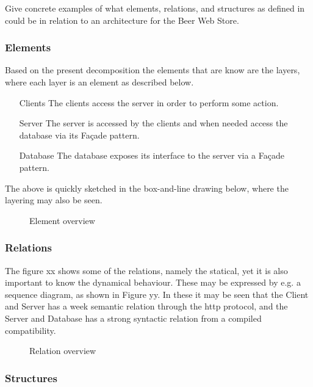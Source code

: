 \begin{question}
Give concrete examples of what elements, relations, and structures as defined in \cite{bass2003sa} could be in relation to an architecture for the Beer Web Store.
\end{question}

\subsubsection{Elements}
Based on the present decomposition the elements that are know are the layers, where each layer is an element as described below.
\begin{itemize}
    \item[Clients] The clients access the server in order to perform some action.
    \item[Server] The server is accessed by the clients and when needed access the database via its Fa\c cade pattern.
    \item[Database] The database exposes its interface to the server via a Fa\c cade pattern.
\end{itemize}
The above is quickly sketched in the box-and-line drawing below, where the layering may also be seen. 
\begin{figure}[!htb]
\centerline{}
\caption{Element overview}
\label{fig:module_view}
\end{figure}
\clearpage

\subsubsection{Relations}
The figure xx shows some of the relations, namely the statical, yet it is also important to know the dynamical behaviour. These may be expressed by e.g. a sequence diagram, as shown in Figure yy. In these it may be seen that the Client and Server has a week semantic relation through the http protocol, and the Server and Database has a strong syntactic relation from a compiled compatibility. 

\begin{figure}[!htb]
\centerline{}
\caption{Relation overview}
\label{fig:sequence}
\end{figure}

\subsubsection{Structures}

